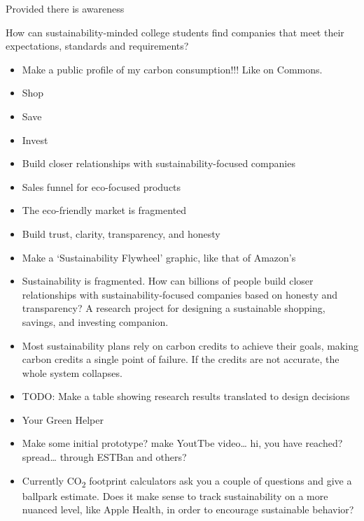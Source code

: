 \documentclass[
  letterpaper,
  DIV=11,
  numbers=noendperiod]{scrartcl}
\begin{document}
Provided there is awareness

How can sustainability-minded college students find companies that meet
their expectations, standards and requirements?

\begin{itemize}
\item
  Make a public profile of my carbon consumption!!! Like on Commons.
\item
  Shop
\item
  Save
\item
  Invest
\item
  Build closer relationships with sustainability-focused companies
\item
  Sales funnel for eco-focused products
\item
  The eco-friendly market is fragmented
\item
  Build trust, clarity, transparency, and honesty
\item
  Make a `Sustainability Flywheel' graphic, like that of Amazon's
\item
  Sustainability is fragmented. How can billions of people build closer
  relationships with sustainability-focused companies based on honesty
  and transparency? A research project for designing a sustainable
  shopping, savings, and investing companion.
\item
  Most sustainability plans rely on carbon credits to achieve their
  goals, making carbon credits a single point of failure. If the credits
  are not accurate, the whole system collapses.
\item
  TODO: Make a table showing research results translated to design
  decisions
\item
  Your Green Helper
\item
  Make some initial prototype? make YoutTbe video\ldots{} hi, you have
  reached? spread\ldots{} through ESTBan and others?
\item
  Currently CO\textsubscript{2} footprint calculators ask you a couple
  of questions and give a ballpark estimate. Does it make sense to track
  sustainability on a more nuanced level, like Apple Health, in order to
  encourage sustainable behavior?
\end{itemize}
\end{document}
